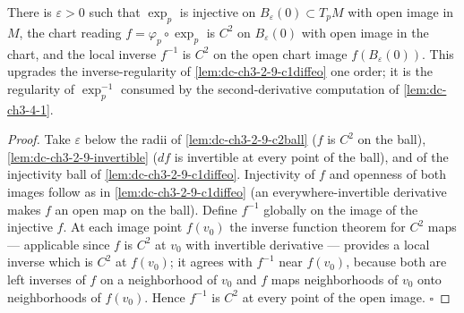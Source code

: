 \begin{lemma}
  \label{lem:dc-ch3-2-9-c2diffeo}
  \leanok
  There is $\varepsilon > 0$ such that $\exp_p$ is injective on
  $B_\varepsilon(0) \subset T_pM$ with open image in $M$, the chart reading
  $f = \varphi_p \circ \exp_p$ is $C^2$ on $B_\varepsilon(0)$ with open image
  in the chart, and the local inverse $f^{-1}$ is $C^2$ on the open chart
  image $f(B_\varepsilon(0))$. This upgrades the inverse-regularity of
  \cref{lem:dc-ch3-2-9-c1diffeo} one order; it is the regularity of
  $\exp_p^{-1}$ consumed by the second-derivative computation of
  \cref{lem:dc-ch3-4-1}.
\end{lemma}
\begin{proof}
  \leanok
  Take $\varepsilon$ below the radii of \cref{lem:dc-ch3-2-9-c2ball} ($f$ is
  $C^2$ on the ball), \cref{lem:dc-ch3-2-9-invertible} ($df$ is invertible at
  every point of the ball), and of the injectivity ball of
  \cref{lem:dc-ch3-2-9-c1diffeo}. Injectivity of $f$ and openness of both
  images follow as in \cref{lem:dc-ch3-2-9-c1diffeo} (an everywhere-invertible
  derivative makes $f$ an open map on the ball). Define $f^{-1}$ globally on
  the image of the injective $f$. At each image point $f(v_0)$ the inverse
  function theorem for $C^2$ maps — applicable since $f$ is $C^2$ at $v_0$
  with invertible derivative — provides a local inverse which is $C^2$ at
  $f(v_0)$; it agrees with $f^{-1}$ near $f(v_0)$, because both are left
  inverses of $f$ on a neighborhood of $v_0$ and $f$ maps neighborhoods of
  $v_0$ onto neighborhoods of $f(v_0)$. Hence $f^{-1}$ is $C^2$ at every
  point of the open image. $\square$
\end{proof}

